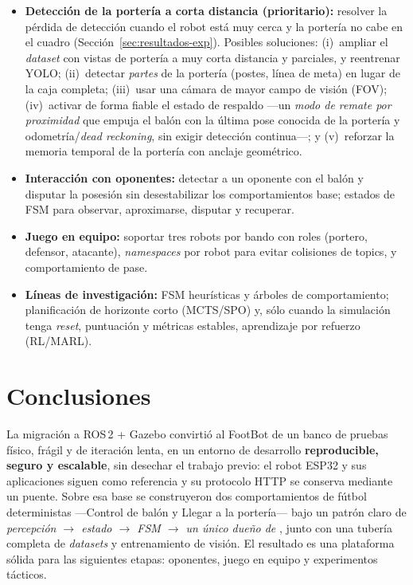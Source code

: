 \documentclass[11pt,a4paper]{article}
\newcommand{\code}[1]{\texttt{\detokenize{#1}}}
\begin{document}
\begin{itemize}
  \item \textbf{Detección de la portería a corta distancia (prioritario):} resolver la pérdida de detección
  cuando el robot está muy cerca y la portería no cabe en el cuadro (Sección~\ref{sec:resultados-exp}).
  Posibles soluciones: (i)~ampliar el \emph{dataset} con vistas de portería a muy corta distancia y
  parciales, y reentrenar YOLO; (ii)~detectar \emph{partes} de la portería (postes, línea de meta) en lugar
  de la caja completa; (iii)~usar una cámara de mayor campo de visión (FOV); (iv)~activar de forma fiable el
  estado de respaldo \code{COMMIT_TO_GOAL} —un \emph{modo de remate por proximidad} que empuja el balón con
  la última pose conocida de la portería y odometría/\emph{dead reckoning}, sin exigir detección continua—;
  y (v)~reforzar la memoria temporal de la portería con anclaje geométrico.
  \item \textbf{Interacción con oponentes:} detectar a un oponente con el balón y disputar la posesión sin
  desestabilizar los comportamientos base; estados de FSM para observar, aproximarse, disputar y recuperar.
  \item \textbf{Juego en equipo:} soportar tres robots por bando con roles (portero, defensor, atacante),
  \emph{namespaces} por robot para evitar colisiones de topics, y comportamiento de pase.
  \item \textbf{Líneas de investigación:} FSM heurísticas y árboles de comportamiento; planificación de
  horizonte corto (MCTS/SPO) y, sólo cuando la simulación tenga \emph{reset}, puntuación y métricas
  estables, aprendizaje por refuerzo (RL/MARL).
\end{itemize}

\section{Conclusiones}
\label{sec:conclusiones}

La migración a ROS\,2 + Gazebo convirtió al FootBot de un banco de pruebas físico, frágil y de iteración
lenta, en un entorno de desarrollo \textbf{reproducible, seguro y escalable}, sin desechar el trabajo previo:
el robot ESP32 y sus aplicaciones siguen como referencia y su protocolo HTTP \code{/move} se conserva mediante
un puente. Sobre esa base se construyeron dos comportamientos de fútbol deterministas —Control de balón y
Llegar a la portería— bajo un patrón claro de \emph{percepción $\rightarrow$ estado $\rightarrow$ FSM $\rightarrow$
un único dueño de} \code{/cmd_vel}, junto con una tubería completa de \emph{datasets} y entrenamiento de visión.
El resultado es una plataforma sólida para las siguientes etapas: oponentes, juego en equipo y experimentos
tácticos.
\end{document}
